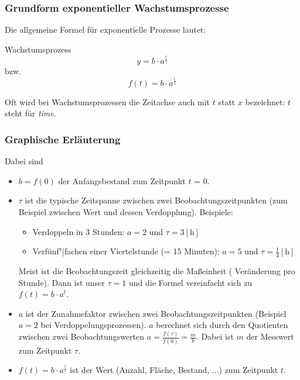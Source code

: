 \newpage



\subsubsection{Grundform exponentieller Wachstumsprozesse}

Die allgemeine Formel für exponentielle Prozesse lautet:

\begin{definition}{Wachstumsprozess}{}
  $$y = b\cdot{}a^{\frac{t}{\tau}}$$
  bzw.
  $$f(t) = b\cdot{}a^{\frac{t}{\tau}}$$
  
\end{definition}


\begin{bemerkung}{}{}
Oft wird bei Wachstumsprozessen die Zeitachse auch mit $t$ statt $x$ bezeichnet: $t$ steht für \textit{time}.
\end{bemerkung}

\newpage

\subsubsection{Graphische Erläuterung}


Dabei sind
\begin{itemize}
\item $b=f(0)$ der Anfangsbestand zum Zeitpunkt $t$ = 0.
\item $\tau$ ist die typische Zeitspanne zwischen zwei Beobachtungszeitpunkten (zum Beispiel zwischen Wert und dessen Verdopplung). Beispiele:
  \begin{itemize}
  \item Verdoppeln in 3 Stunden: $a=2$ und $\tau = 3 [\textrm{h}]$
  \item Verfünf"|fachen einer Viertelstunde (= 15 Minuten): $a=5$ und
    $\tau=\frac{1}{4} [\textrm{h}]$
  \end{itemize}
  Meist ist die Beobachtungszeit gleichzeitig die Maßeinheit (\zB
  Veränderung pro Stunde). Dann ist unser $\tau=1$ und die Formel
  vereinfacht sich zu $f(t) = b\cdot{}a^t$.
\item $a$ ist der Zunahmefaktor zwischen zwei Beobachtungszeitpunkten (Beispiel $a=2$ bei Verdoppelungsprozessen).
  $a$ berechnet sich durch den Quotienten zwischen zwei
  Beobachtungswerten $a = \frac{f(\tau)}{f(0)} =\frac{m}{b}$. Dabei
  ist $m$ der Messwert zum Zeitpunkt $\tau$.
\item $f(t)=b\cdot{}a^{\frac{t}{\tau}}$ ist der Wert (Anzahl, Fläche,
  Bestand, ...) zum Zeitpunkt
  $t$. 
\end{itemize}

